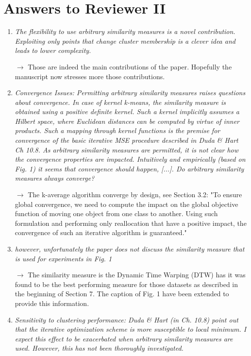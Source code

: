 \documentclass[10pt]{article}
\begin{document}
\section{Answers to Reviewer II}


\begin{enumerate}

\item \emph{The flexibility to use arbitrary similarity measures is a novel contribution.\\ Exploiting only points that change cluster membership is a clever idea and leads to lower complexity.}

$\rightarrow$ Those are indeed the main contributions of the paper. Hopefully the manuscript now stresses more those contributions.


\item \emph{Convergence Issues: Permitting arbitrary similarity measures raises questions about convergence. In case of kernel k-means, the similarity measure is obtained using a positive definite kernel. Such a kernel implicitly assumes a Hilbert space, where Euclidean distances can be computed by virtue of inner products. Such a mapping through kernel functions is the premise for convergence of the basic iterative MSE procedure described in Duda \& Hart Ch 10.8. As arbitrary similarity measures are permitted, it is not clear how the convergence properties are impacted. Intuitively and empirically (based on Fig. 1) it seems that convergence should happen, [...]. Do arbitrary similarity measures always converge?}

$\rightarrow$ The k-average algorithm converge by design, see Section 3.2: "To ensure global convergence, we need to compute the impact on the global objective function of moving one object from one class to another. Using such formulation and performing only reallocation that have a positive impact, the convergence of such an iterative algorithm is guaranteed."

\item \emph{however, unfortunately the paper does not discuss the similarity measure that is used for experiments in Fig. 1}

$\rightarrow$ The similarity measure is the Dynamic Time Warping (DTW) has it was found to be the best performing measure for those datasets as described in the beginning of Section 7. The caption of Fig. 1 have been extended to provide this information.


\item \emph{Sensitivity to clustering performance:
Duda \& Hart (in Ch. 10.8) point out that the iterative optimization scheme is more susceptible to local minimum. I expect this effect to be exacerbated when arbitrary similarity measures are used. However, this has not been thoroughly investigated.}


\end{enumerate}
\end{document}
